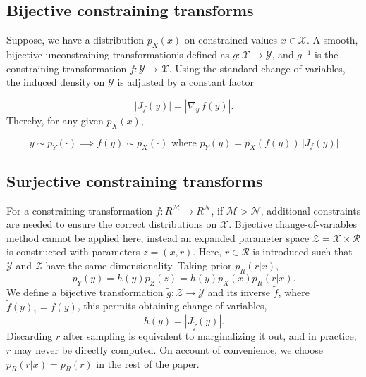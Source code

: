 \documentclass[11pt]{article}
\newcommand{\abs}[1]{\left| #1 \right|}
\newcommand{\absdet}[1]{\abs{#1}}
\begin{document}
\subsection{Bijective constraining transforms}

 Suppose, we have a distribution $p_X(x)$ on constrained values $x \in \mathcal{X}$. A smooth, bijective unconstraining transformationis defined as $g : \mathcal{X} \rightarrow \mathcal{Y}$, and $g^{-1}$ is the constraining transformation $f : \mathcal{Y} \rightarrow \mathcal{X}$.  Using the standard change of variables, the induced density on $\mathcal{Y}$ is adjusted by a constant factor 
 
 \[\absdet{J_f(y)} = \absdet{\nabla_y \, f(y)}.
 \]
Thereby, for any given $p_X(x)$, 
 
 \[
 y \sim p_Y(\cdot) \implies f(y) \sim p_X(\cdot) \, \, \text{where} \, \, p_Y(y) = p_X(f(y)) \, \absdet{J_f(y)}
\]


\subsection{Surjective constraining transforms}


For a constraining transformation $f: R^\mathcal{M} \rightarrow R^\mathcal{N}$, if $\mathcal{M} >  \mathcal{N}$, additional constraints are needed to ensure the correct distributions on $\mathcal{X}$. Bijective change-of-variables method cannot be applied here, instead an expanded parameter space $\mathcal{Z} = \mathcal{X} \times \mathcal{R}$ is constructed with parameters $z = (x, r)$. Here, $r \in \mathcal{R}$ is introduced such that $\mathcal{Y}$ and $\mathcal{Z}$ have the same dimensionality. Taking prior $p_R(r | x)$,
\[
p_Y(y) = h(y) p_Z(z) = h(y) p_X(x) p_R(r | x).
\]
We define a bijective transformation $\tilde{g}: \mathcal{Z} \to \mathcal{Y}$ and its inverse $\tilde{f}$, where $\tilde{f}(y)_1 = f(y)$, this permits obtaining change-of-variables,
\[
h(y) = |J_{\tilde{f}}(y)|.
\]
Discarding $r$ after sampling is equivalent to marginalizing it out, and in practice, $r$ may never be directly computed. On account of convenience,  we choose $p_R(r | x) = p_R(r)$ in the rest of the paper.

\end{document}
